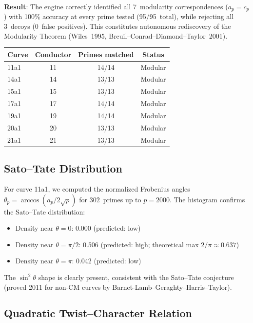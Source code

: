 \documentclass[11pt,a4paper]{article}
\begin{document}
\textbf{Result}: The engine correctly identified all 7~modularity
correspondences ($a_p = c_p$) with 100\% accuracy at every prime tested
(95/95~total), while rejecting all 3~decoys (0~false positives). This
constitutes autonomous rediscovery of the Modularity Theorem
(Wiles~1995, Breuil--Conrad--Diamond--Taylor~2001).

\begin{center}
\begin{tabular}{lccc}
  \toprule
  Curve & Conductor & Primes matched & Status \\
  \midrule
  11a1 & 11 & 14/14 & Modular \\
  14a1 & 14 & 13/13 & Modular \\
  15a1 & 15 & 13/13 & Modular \\
  17a1 & 17 & 14/14 & Modular \\
  19a1 & 19 & 14/14 & Modular \\
  20a1 & 20 & 13/13 & Modular \\
  21a1 & 21 & 13/13 & Modular \\
  \bottomrule
\end{tabular}
\end{center}

\subsection{Sato--Tate Distribution}

For curve 11a1, we computed the normalized Frobenius angles
$\theta_p = \arccos(a_p / 2\sqrt{p})$ for 302~primes up to $p = 2000$.
The histogram confirms the Sato--Tate distribution:

\begin{itemize}
  \item Density near $\theta = 0$: 0.000 (predicted: low)
  \item Density near $\theta = \pi/2$: 0.506 (predicted: high; theoretical max $2/\pi \approx 0.637$)
  \item Density near $\theta = \pi$: 0.042 (predicted: low)
\end{itemize}

The $\sin^2\theta$ shape is clearly present, consistent with the
Sato--Tate conjecture (proved 2011 for non-CM curves by
Barnet-Lamb--Geraghty--Harris--Taylor).

\subsection{Quadratic Twist--Character Relation}
\end{document}
